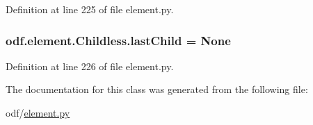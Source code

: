 Definition at line 225 of file element.\+py.

\hypertarget{classodf_1_1element_1_1Childless_a846e55e8931bcc3c90754e3b45110e96}{
\subsubsection[{last\+Child}]{\setlength{\rightskip}{0pt plus 5cm}odf.\+element.\+Childless.\+last\+Child = None\hspace{0.3cm}{\ttfamily [static]}}}\label{classodf_1_1element_1_1Childless_a846e55e8931bcc3c90754e3b45110e96}


Definition at line 226 of file element.\+py.



The documentation for this class was generated from the following file\+:\begin{DoxyCompactItemize}
\item 
odf/\hyperlink{element_8py}{element.\+py}\end{DoxyCompactItemize}
